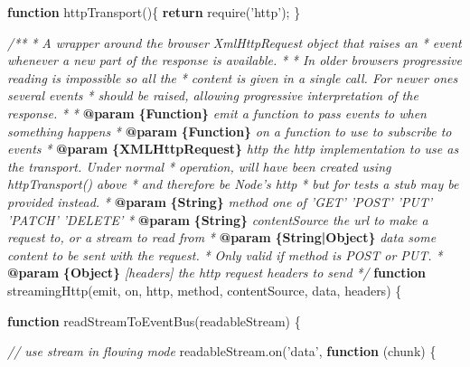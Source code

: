 \documentclass[12pt, ]{article}
\newenvironment{Shaded}{}{}
\newcommand{\KeywordTok}[1]{\textcolor[rgb]{0.00,0.44,0.13}{\textbf{{#1}}}}
\newcommand{\StringTok}[1]{\textcolor[rgb]{0.25,0.44,0.63}{{#1}}}
\newcommand{\CommentTok}[1]{\textcolor[rgb]{0.38,0.63,0.69}{\textit{{#1}}}}
\newcommand{\OtherTok}[1]{\textcolor[rgb]{0.00,0.44,0.13}{{#1}}}
\newcommand{\FunctionTok}[1]{\textcolor[rgb]{0.02,0.16,0.49}{{#1}}}
\newcommand{\NormalTok}[1]{{#1}}
\begin{document}
\begin{Shaded}
\begin{Highlighting}[]
\KeywordTok{function} \FunctionTok{httpTransport}\NormalTok{()\{}
   \KeywordTok{return} \FunctionTok{require}\NormalTok{(}\StringTok{'http'}\NormalTok{);}
\NormalTok{\}}

\CommentTok{/**}
\CommentTok{ * A wrapper around the browser XmlHttpRequest object that raises an }
\CommentTok{ * event whenever a new part of the response is available.}
\CommentTok{ * }
\CommentTok{ * In older browsers progressive reading is impossible so all the }
\CommentTok{ * content is given in a single call. For newer ones several events}
\CommentTok{ * should be raised, allowing progressive interpretation of the response.}
\CommentTok{ *      }
\CommentTok{ * }\KeywordTok{@param}\CommentTok{ }\KeywordTok{\{Function\}}\CommentTok{ emit a function to pass events to when something happens}
\CommentTok{ * }\KeywordTok{@param}\CommentTok{ }\KeywordTok{\{Function\}}\CommentTok{ on a function to use to subscribe to events}
\CommentTok{ * }\KeywordTok{@param}\CommentTok{ }\KeywordTok{\{XMLHttpRequest\}}\CommentTok{ http the http implementation to use as the transport. Under normal}
\CommentTok{ *          operation, will have been created using httpTransport() above}
\CommentTok{ *          and therefore be Node's http}
\CommentTok{ *          but for tests a stub may be provided instead.}
\CommentTok{ * }\KeywordTok{@param}\CommentTok{ }\KeywordTok{\{String\}}\CommentTok{ method one of 'GET' 'POST' 'PUT' 'PATCH' 'DELETE'}
\CommentTok{ * }\KeywordTok{@param}\CommentTok{ }\KeywordTok{\{String\}}\CommentTok{ contentSource the url to make a request to, or a stream to read from}
\CommentTok{ * }\KeywordTok{@param}\CommentTok{ }\KeywordTok{\{String|Object\}}\CommentTok{ data some content to be sent with the request.}
\CommentTok{ *                        Only valid if method is POST or PUT.}
\CommentTok{ * }\KeywordTok{@param}\CommentTok{ }\KeywordTok{\{Object\}}\CommentTok{ [headers] the http request headers to send                       }
\CommentTok{ */}  
\KeywordTok{function} \FunctionTok{streamingHttp}\NormalTok{(emit, on, http, method, contentSource, data, headers) \{}

   \KeywordTok{function} \FunctionTok{readStreamToEventBus}\NormalTok{(readableStream) \{}
         
      \CommentTok{// use stream in flowing mode   }
      \OtherTok{readableStream}\NormalTok{.}\FunctionTok{on}\NormalTok{(}\StringTok{'data'}\NormalTok{, }\KeywordTok{function} \NormalTok{(chunk) \{}
                                             

\end{Highlighting}
\end{Shaded}
\end{document}
